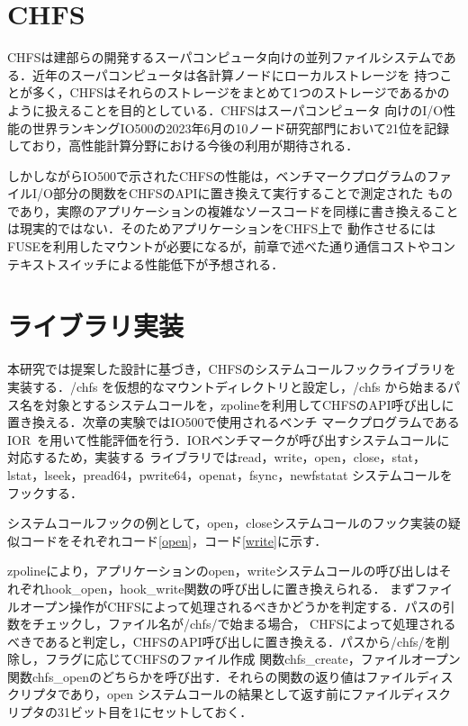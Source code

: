 \documentclass[a4paper,11pt]{jreport}
\begin{document}
\section{CHFS}
CHFSは建部らの開発するスーパコンピュータ向けの並列ファイルシステムである．近年のスーパコンピュータは各計算ノードにローカルストレージを
持つことが多く，CHFSはそれらのストレージをまとめて1つのストレージであるかのように扱えることを目的としている．CHFSはスーパコンピュータ
向けのI/O性能の世界ランキングIO500の2023年6月の10ノード研究部門において21位を記録しており，高性能計算分野における今後の利用が期待される．

しかしながらIO500で示されたCHFSの性能は，ベンチマークプログラムのファイルI/O部分の関数をCHFSのAPIに置き換えて実行することで測定された
ものであり，実際のアプリケーションの複雑なソースコードを同様に書き換えることは現実的ではない．そのためアプリケーションをCHFS上で
動作させるにはFUSEを利用したマウントが必要になるが，前章で述べた通り通信コストやコンテキストスイッチによる性能低下が予想される．

\section{ライブラリ実装}
本研究では提案した設計に基づき，CHFSのシステムコールフックライブラリを実装する．/chfs を仮想的なマウントディレクトリと設定し，/chfs
から始まるパス名を対象とするシステムコールを，zpolineを利用してCHFSのAPI呼び出しに置き換える．次章の実験ではIO500で使用されるベンチ
マークプログラムであるIOR~\cite{ior}を用いて性能評価を行う．IORベンチマークが呼び出すシステムコールに対応するため，実装する
ライブラリではread，write，open，close，stat，lstat，lseek，pread64，pwrite64，openat，fsync，newfstatat システムコールを
フックする．

システムコールフックの例として，open，closeシステムコールのフック実装の疑似コードをそれぞれコード\ref{open}，コード\ref{write}に示す．

zpolineにより，アプリケーションのopen，writeシステムコールの呼び出しはそれぞれhook\_open，hook\_write関数の呼び出しに置き換えられる．
まずファイルオープン操作がCHFSによって処理されるべきかどうかを判定する．パスの引数をチェックし，ファイル名が/chfs/で始まる場合，
CHFSによって処理されるべきであると判定し，CHFSのAPI呼び出しに置き換える．パスから/chfs/を削除し，フラグに応じてCHFSのファイル作成
関数chfs\_create，ファイルオープン関数chfs\_openのどちらかを呼び出す．それらの関数の返り値はファイルディスクリプタであり，open
システムコールの結果として返す前にファイルディスクリプタの31ビット目を1にセットしておく．
\end{document}
